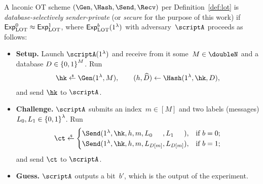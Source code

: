 \begin{definition}\label{def:lot-security}
A laconic OT scheme $(\Gen,\Hash,\allowbreak\Send,\Recv)$ per Definition~\ref{def:lot} is \emph{database-selectively sender-private} (or \emph{secure} for the purpose of this work) if ${\ExpLOT{0}\approx\ExpLOT{1}}$, where $\ExpLOT{b}(1^\lambda)$ with adversary~$\scriptA$ proceeds as follows:
\begin{itemize}\upshape
\item\textbf{Setup.}
Launch $\scriptA(1^\lambda)$ and
receive from it some~${M\in\doubleN}$ and a database ${D\in{\{0,1\}}^M}$.
Run
\begin{align*}
\hk\draws\Gen(1^\lambda,M),\qquad
(h,\widehat{D})\gets\Hash(1^\lambda,\hk,D),
\end{align*}
and send $\hk$ to $\scriptA$.
\item\textbf{Challenge.}
$\scriptA$ submits an index~${m\in[M]}$ and
two labels (messages) ${L_0,L_1\in{\{0,1\}}^\lambda}$.
Run
\begin{align*}
\ct\draws\begin{cases}
\Send(1^\lambda,\hk,h,m,
L_{\mathrlap{0}\phantom{D[m]}},L_{\mathrlap{1}\phantom{D[m]}}),&
\textup{if }b=0;\\
\Send(1^\lambda,\hk,h,m,L_{D[m]},L_{D[m]}),&\textup{if }b=1;
\end{cases}
\end{align*}
and send $\ct$ to $\scriptA$.
\item\textbf{Guess.}
$\scriptA$ outputs a bit~$b'$, which is the output of the experiment.
\end{itemize}
\end{definition}
